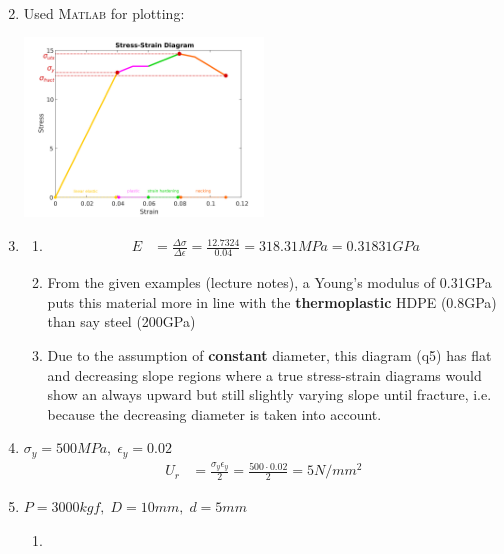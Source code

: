 \documentclass[11pt]{article}
\newcommand{\matlab}{\textsc{Matlab }} %
\begin{document}
\begin{enumerate}
\begin{align*}
            \end{align*}
            \newpage
      \item Used \matlab for plotting: \\
            \begin{center}
                  \includegraphics[width=0.5\textwidth]{q5_fig_anot.png}
            \end{center}
            
      \item
            \begin{enumerate}
                  \item \begin{align*}
                              E & = \frac{\Delta \sigma}{\Delta \epsilon} = \frac{12.7324}{0.04} = 318.31MPa = 0.31831GPa
                        \end{align*}
                  \item From the given examples (lecture notes), a Young's modulus of 0.31GPa puts this material more in line with the \textbf{thermoplastic} HDPE (0.8GPa) than say steel (200GPa)
                  \item Due to the assumption of \textbf{constant} diameter, this diagram (q5) has flat and decreasing slope regions where a true stress-strain diagrams would show an always upward but still slightly varying slope until fracture, i.e. because the decreasing diameter is taken into account.
            \end{enumerate}
      \item $\sigma_y = 500MPa, \; \epsilon_y = 0.02$
            \begin{align*}
                  U_r & = \frac{\sigma_y \epsilon_y}{2} = \frac{500{\cdot}0.02}{2} = 5N/mm^2
            \end{align*}
            \newpage
      \item $P = 3000kgf, \; D=10mm, \; d=5mm$
            \begin{enumerate}
                  \item \begin{align*}

\end{align*}
\end{enumerate}
\end{enumerate}
\end{document}
